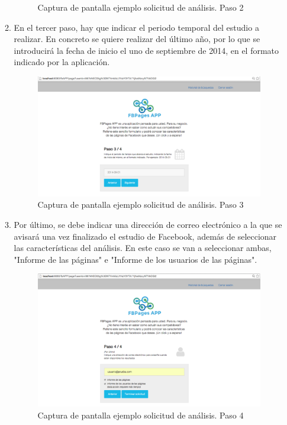 \begin{itemize}
\begin{enumerate}
\begin{figure}[H]
\caption{Captura de pantalla ejemplo solicitud de análisis. Paso 2} \label{fig:exPaso2}
\end{figure}
\item En el tercer paso, hay que indicar el periodo temporal del estudio a realizar. En concreto se quiere realizar del último año, por lo que se introducirá la fecha de inicio el uno de septiembre de 2014, en el formato indicado por la aplicación.
\begin{figure}[H]
\centering
\includegraphics[width=5in]{figuras/ejemploPaso3.png}
\caption{Captura de pantalla ejemplo solicitud de análisis. Paso 3} \label{fig:exPaso3}
\end{figure}
\item Por último, se debe indicar una dirección de correo electrónico a la que se avisará una vez finalizado el estudio de Facebook, además de seleccionar las características del análisis. En este caso se van a seleccionar ambas, "Informe de las páginas" e "Informe de los usuarios de las páginas". 
\begin{figure}[H]
\centering
\includegraphics[width=5in]{figuras/ejemploPaso4.png}
\caption{Captura de pantalla ejemplo solicitud de análisis. Paso 4} \label{fig:exPaso4}

\end{figure}
\end{enumerate}
\end{itemize}

